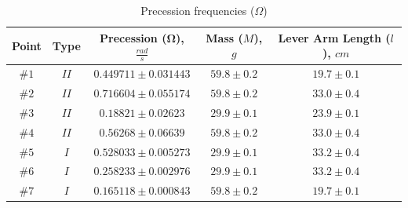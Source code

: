 \begin{table}[ht!]
  \centering
  \begin{tabular}{|c|c|c|c|c|}
    Point & Type & Precession ($\boldsymbol\Omega$), $\frac{rad}{s}$ & Mass ($M$), $g$ & Lever Arm Length ($l$), $cm$ \\ \hline
    $\#1$ & $II$ & $0.449711 \pm 0.031443$ & $59.8 \pm 0.2$ & $19.7 \pm 0.1$ \\ \hline
    $\#2$ & $II$ & $0.716604 \pm 0.055174$ & $59.8 \pm 0.2$ & $33.0 \pm 0.4$ \\ \hline
    $\#3$ & $II$ & $0.18821 \pm 0.02623$   & $29.9 \pm 0.1$ & $23.9 \pm 0.1$ \\ \hline
    $\#4$ & $II$ & $0.56268 \pm 0.06639$   & $59.8 \pm 0.2$ & $33.0 \pm 0.4$ \\ \hline
    $\#5$ & $I$  & $0.528033 \pm 0.005273$ & $29.9 \pm 0.1$ & $33.2 \pm 0.4$ \\ \hline
    $\#6$ & $I$  & $0.258233 \pm 0.002976$ & $29.9 \pm 0.1$ & $33.2 \pm 0.4$ \\ \hline
    $\#7$ & $I$  & $0.165118 \pm 0.000843$ & $59.8 \pm 0.2$ & $19.7 \pm 0.1$ \\ \hline
  \end{tabular}
  \caption{Precession frequencies ($\Omega$)}
  \label{tab:results:precession}
\end{table}


